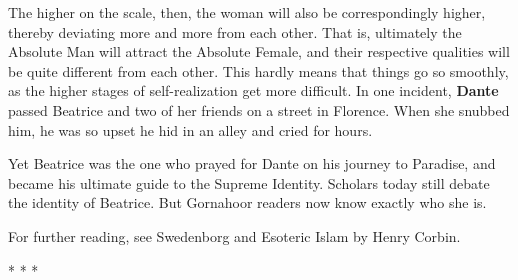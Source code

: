 The higher on the scale, then, the woman will also be correspondingly higher, thereby deviating more and more from each other. That is, ultimately the Absolute Man will attract the Absolute Female, and their respective qualities will be quite different from each other. This hardly means that things go so smoothly, as the higher stages of self-realization get more difficult. In one incident, \textbf{Dante} passed Beatrice and two of her friends on a street in Florence. When she snubbed him, he was so upset he hid in an alley and cried for hours.

Yet Beatrice was the one who prayed for Dante on his journey to Paradise, and became his ultimate guide to the Supreme Identity. Scholars today still debate the identity of Beatrice. But Gornahoor readers now know exactly who she is.


\hfill

For further reading, see Swedenborg and Esoteric Islam by Henry Corbin.




\begin{center}* * *\end{center}

